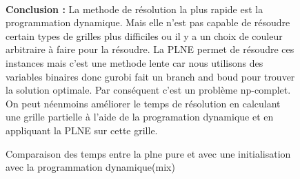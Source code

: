 \documentclass[a4paper]{memoir}
\begin{document}
\begin{figure}[h]
\caption{Comparaison des temps entre la plne pure et avec une initialisation avec la programmation dynamique(mix)}
\\
\textbf{Conclusion : }La methode de résolution la plus rapide est la programmation dynamique. Mais elle n'est pas capable de résoudre certain types de grilles plus difficiles ou il y a un choix de couleur arbitraire à faire pour la résoudre. La PLNE permet de résoudre ces instances mais c'est une methode lente car nous utilisons des variables binaires donc gurobi fait un branch and boud pour trouver la solution optimale. Par conséquent c'est un problème np-complet. On peut néenmoins améliorer le temps de résolution en calculant une grille partielle à l'aide de la programation dynamique et en appliquant la PLNE sur cette grille.
\end{figure}

        
\end{document}
